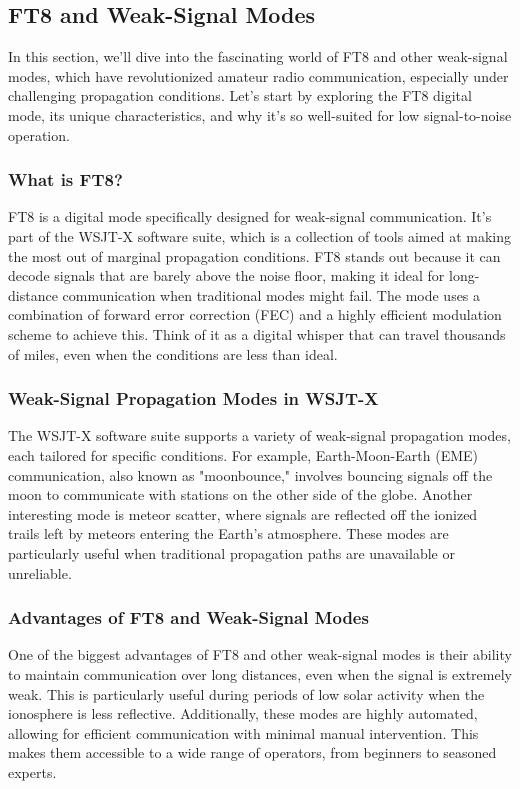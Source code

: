 \subsection{FT8 and Weak-Signal Modes}
\label{subsec:ft8-weak}

In this section, we'll dive into the fascinating world of FT8 and other weak-signal modes, which have revolutionized amateur radio communication, especially under challenging propagation conditions. Let's start by exploring the FT8 digital mode, its unique characteristics, and why it's so well-suited for low signal-to-noise operation.

\subsubsection*{What is FT8?}
FT8 is a digital mode specifically designed for weak-signal communication. It's part of the WSJT-X software suite, which is a collection of tools aimed at making the most out of marginal propagation conditions. FT8 stands out because it can decode signals that are barely above the noise floor, making it ideal for long-distance communication when traditional modes might fail. The mode uses a combination of forward error correction (FEC) and a highly efficient modulation scheme to achieve this. Think of it as a digital whisper that can travel thousands of miles, even when the conditions are less than ideal.

\subsubsection*{Weak-Signal Propagation Modes in WSJT-X}
The WSJT-X software suite supports a variety of weak-signal propagation modes, each tailored for specific conditions. For example, Earth-Moon-Earth (EME) communication, also known as "moonbounce," involves bouncing signals off the moon to communicate with stations on the other side of the globe. Another interesting mode is meteor scatter, where signals are reflected off the ionized trails left by meteors entering the Earth's atmosphere. These modes are particularly useful when traditional propagation paths are unavailable or unreliable.

\subsubsection*{Advantages of FT8 and Weak-Signal Modes}
One of the biggest advantages of FT8 and other weak-signal modes is their ability to maintain communication over long distances, even when the signal is extremely weak. This is particularly useful during periods of low solar activity when the ionosphere is less reflective. Additionally, these modes are highly automated, allowing for efficient communication with minimal manual intervention. This makes them accessible to a wide range of operators, from beginners to seasoned experts.

